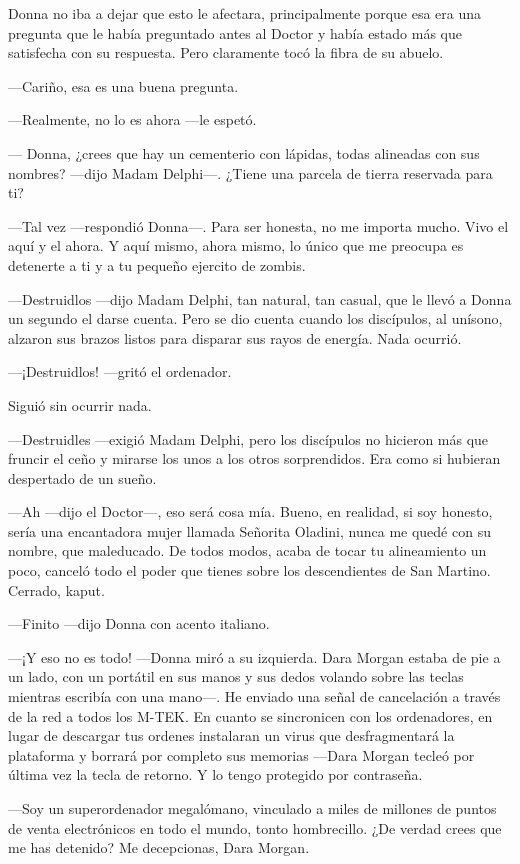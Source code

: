 Donna no iba a dejar que esto le afectara, principalmente porque esa era
una pregunta que le había preguntado antes al Doctor y había estado más
que satisfecha con su respuesta. Pero claramente tocó la fibra de su
abuelo.

---Cariño, esa es una buena pregunta.

---Realmente, no lo es ahora ---le espetó.

--- Donna, ¿crees que hay un cementerio con lápidas, todas alineadas con
sus nombres? ---dijo Madam Delphi---. ¿Tiene una parcela de tierra
reservada para ti?

---Tal vez ---respondió Donna---. Para ser honesta, no me importa mucho.
Vivo el aquí y el ahora. Y aquí mismo, ahora mismo, lo único que me
preocupa es detenerte a ti y a tu pequeño ejercito de zombis.

---Destruidlos ---dijo Madam Delphi, tan natural, tan casual, que le
llevó a Donna un segundo el darse cuenta. Pero se dio cuenta cuando los
discípulos, al unísono, alzaron sus brazos listos para disparar sus
rayos de energía. Nada ocurrió.

---¡Destruidlos! ---gritó el ordenador.

Siguió sin ocurrir nada.

---Destruidles ---exigió Madam Delphi, pero los discípulos no hicieron
más que fruncir el ceño y mirarse los unos a los otros sorprendidos. Era
como si hubieran despertado de un sueño.

---Ah ---dijo el Doctor---, eso será cosa mía. Bueno, en realidad, si
soy honesto, sería una encantadora mujer llamada Señorita Oladini, nunca
me quedé con su nombre, que maleducado. De todos modos, acaba de tocar
tu alineamiento un poco, canceló todo el poder que tienes sobre los
descendientes de San Martino. Cerrado, kaput.

---Finito ---dijo Donna con acento italiano.

---¡Y eso no es todo! ---Donna miró a su izquierda. Dara Morgan estaba
de pie a un lado, con un portátil en sus manos y sus dedos volando sobre
las teclas mientras escribía con una mano---. He enviado una señal de
cancelación a través de la red a todos los M-TEK. En cuanto se
sincronicen con los ordenadores, en lugar de descargar tus ordenes
instalaran un virus que desfragmentará la plataforma y borrará por
completo sus memorias ---Dara Morgan tecleó por última vez la tecla de
retorno. Y lo tengo protegido por contraseña.

---Soy un superordenador megalómano, vinculado a miles de millones de
puntos de venta electrónicos en todo el mundo, tonto hombrecillo. ¿De
verdad crees que me has detenido? Me decepcionas, Dara Morgan.

